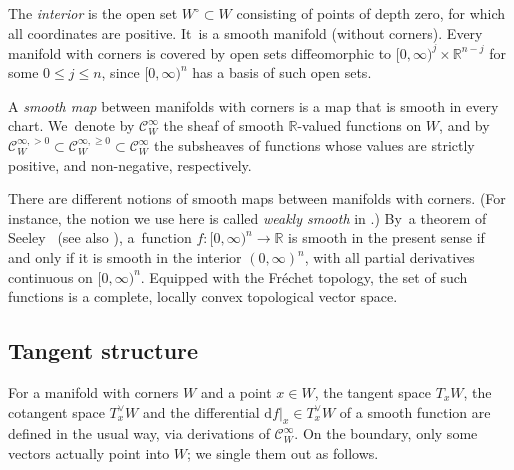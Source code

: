 \documentclass[JEP,XML,SOM,Unicode,NoFloatCountersInSection,published]{cedram}
\theoremstyle{definition}
\theoremstyle{remark}
\newenvironment{remark}
  {\pushQED{\qed}\renewcommand{\qedsymbol}{$\lozenge$}\remarkx}
  {\popQED\endremarkx}
\let\defn\emph
\newcommand{\RR}{\mathbb{R}}
\newcommand{\halfspc}[1]{[0,\infty)^{#1}}
\renewcommand{\le}{\leqslant}
\renewcommand{\ge}{\geqslant}
\newcommand{\Cinf}[1]{\mathscr{C}^{\infty}_{#1}}
\newcommand{\Cinfpos}[1]{\mathscr{C}^{\infty, > 0}_{#1}}
\newcommand{\Cinfge}[1]{\mathscr{C}^{\infty, \ge 0}_{#1}}
\newcommand{\dd}{\mathrm{d}}
\newcommand{\tb}[2][]{T_{#1}#2}
\newcommand{\ctb}[2][]{T^\vee_{#1}#2}
\begin{document}
The \defn{interior} is the open set $W^\circ \subset W$ consisting of points of depth zero, \ie for which all coordinates are positive. It~is a smooth manifold (without corners).
\begin{remark}
Every manifold with corners is covered by open sets diffeomorphic to $\halfspc{j}\times\RR^{n-j}$ for some $0\le j\le n$, since $\halfspc{n}$ has a basis of such open sets.
\end{remark}

\begin{definition}
A \defn{smooth map} between manifolds with corners is a map that is smooth in every chart. We~denote by $\Cinf{W}$ the sheaf of smooth $\RR$-valued functions on $W$, and by $\Cinfpos{W}\subset\Cinfge{W}\subset\Cinf{W}$ the subsheaves of functions whose values are strictly positive, and non-negative, respectively.
\end{definition}
\begin{remark}\label{rem:Ck-topology}
There are different notions of smooth maps between manifolds with corners. (For instance, the notion we use here is called \emph{weakly smooth} in \cite{Joyce:ManifoldsWithCorners}.) By~a theorem of Seeley~\cite{Seeley} (see also \cite{Melrose1996}), a~function $f\colon [0,\infty)^n \to \RR$ is smooth in the present sense if and only if it is smooth in the interior $(0,\infty)^n$, with all partial derivatives continuous on $\halfspc{n}$. Equipped with the Fréchet topology, the set of such functions is a complete, locally convex topological vector space.
\end{remark}

\subsection{Tangent structure}\label{sec:tangent-structure-manifolds-with-corners}

For a manifold with corners $W$ and a point $x\in W$, the tangent space $\tb[x]{W}$, the cotangent space $\ctb[x]{W}$ and the differential $\dd f|_x \in \ctb[x]{W}$ of a smooth function are defined in the usual way, via derivations of $\Cinf{W}$. On the boundary, only some vectors actually point into $W$; we single them out as follows.
\end{document}

